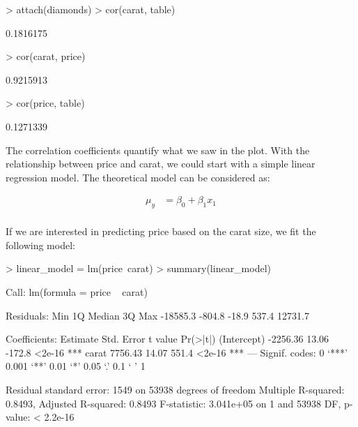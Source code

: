 \documentclass{article}
\begin{document}
\begin{Schunk}
\begin{Sinput}
> attach(diamonds)
> cor(carat, table)
\end{Sinput}
\begin{Soutput}
[1] 0.1816175
\end{Soutput}
\begin{Sinput}
> cor(carat, price)
\end{Sinput}
\begin{Soutput}
[1] 0.9215913
\end{Soutput}
\begin{Sinput}
> cor(price, table)
\end{Sinput}
\begin{Soutput}
[1] 0.1271339
\end{Soutput}
\end{Schunk}

The correlation coefficients quantify what we saw in the plot.  With the relationship between price and carat, we could start with a simple linear regression model. The theoretical model can be considered as:  

\begin{eqnarray*}
\mu_y&=\beta_0 + \beta_1 x_1 \\
\end{eqnarray*}

If we are interested in predicting price based on the carat size, we fit the following model:

\begin{Schunk}
\begin{Sinput}
> linear_model = lm(price~carat)
> summary(linear_model)
\end{Sinput}
\begin{Soutput}
Call:
lm(formula = price ~ carat)

Residuals:
     Min       1Q   Median       3Q      Max 
-18585.3   -804.8    -18.9    537.4  12731.7 

Coefficients:
            Estimate Std. Error t value Pr(>|t|)    
(Intercept) -2256.36      13.06  -172.8   <2e-16 ***
carat        7756.43      14.07   551.4   <2e-16 ***
---
Signif. codes:  0 ‘***’ 0.001 ‘**’ 0.01 ‘*’ 0.05 ‘.’ 0.1 ‘ ’ 1

Residual standard error: 1549 on 53938 degrees of freedom
Multiple R-squared:  0.8493,	Adjusted R-squared:  0.8493 
F-statistic: 3.041e+05 on 1 and 53938 DF,  p-value: < 2.2e-16
\end{Soutput}
\end{Schunk}
\end{document}
